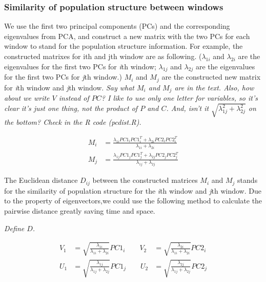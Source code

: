 \documentclass[11pt, oneside]{article}   	%
\newcommand{\plr}[1]{{\em \color{blue} #1}}
\begin{document}
\subsubsection{Similarity of population structure between windows}
We use the first two principal components (PCs) and the corresponding eigenvalues from PCA, and construct a new matrix with the two PCs for each window to stand for the population structure information. 
For example, the constructed matrixes for ith and jth window are as following. 
($\lambda _{1i}$ and $\lambda _{2i}$ are the eigenvalues for the first two PCs for \textit{i}th window; $\lambda _{1j}$ and $\lambda _{2j}$ are the eigenvalues for the first two PCs for \textit{j}th window.) $M_i$ and $M_j$ are the constructed new matrix for \textit{i}th window and \textit{j}th window.
\plr{
Say what $M_i$ and $M_j$ are in the text.  
Also, how about we write $V$ instead of $PC$?  I like to use only one letter for variables, so it's clear it's just one thing, not the product of $P$ and $C$.
And, isn't it $\sqrt{\lambda_{1j}^2+\lambda_{2j}^2}$ on the bottom? Check in the R code (pc{\textunderscore}dist.R).
}

\begin{align}
    M_{i} &= \frac{\lambda_{1i}PC1_{i}PC1_{i}^{T}+\lambda_{2i}PC2_{i}PC2_{i}^{T}}{\lambda_{1i}+\lambda_{2i}} \\
    M_{j} &= \frac{\lambda_{1j}PC1_{j}PC1_{j}^{T}+\lambda_{2j}PC2_{j}PC2_{j}^{T}}{\lambda_{1j}+\lambda_{2j}}
\end{align}

The Euclidean distance $D_{ij}$ between the constructed matrices $M_i$ and $M_j$ stands for the similarity of population structure for the \textit{i}th window and \textit{j}th window. 
Due to the property of eigenvectors,we could use the following method to calculate the pairwise distance greatly saving time and space.

\plr{Define $D$.}

\begin{equation}
    \begin{aligned}
        V_{1}&=\sqrt{\frac{\lambda _{1i}}{\lambda _{1i}+\lambda _{2i}}}PC1_{i} \qquad
        V_{2}&=\sqrt{\frac{\lambda _{2i}}{\lambda _{1i}+\lambda _{2i}}}PC2_{i} \\
        U_{1}&=\sqrt{\frac{\lambda _{1j}}{\lambda _{1j}+\lambda _{2j}}}PC1_{j} \qquad
        U_{2}&=\sqrt{\frac{\lambda _{2j}}{\lambda _{1j}+\lambda _{2j}}}PC2_{j}
    \end{aligned}
\end{equation}
\end{document}
